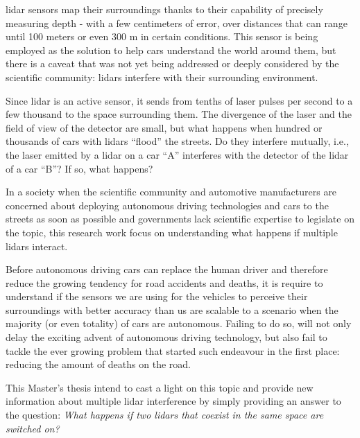 \ac{lidar} sensors map their surroundings thanks to their capability of precisely measuring depth - with a few centimeters of error, over distances that can range until 100 meters \cite{vlp16, Sullivan2016} or even 300 m in certain conditions. This sensor is being employed as the solution to help cars understand the world around them, but there is a caveat that was not yet being addressed or deeply considered by the scientific community: \acp{lidar} interfere with their surrounding environment.

Since \ac{lidar} is an active sensor, it sends from tenths of laser pulses per second to a few thousand to the space surrounding them. The divergence of the laser and the field of view of the detector are small, but what happens when hundred or thousands of cars with \acp{lidar} ``flood'' the streets. Do they interfere mutually, i.e., the laser emitted by a \ac{lidar} on a car ``A'' interferes with the detector of the \ac{lidar} of a car ``B''? If so, what happens? 

In a society when the scientific community and automotive manufacturers are concerned about deploying autonomous driving technologies and cars to the streets as soon as possible and governments lack scientific expertise to legislate on the topic, this research work focus on understanding what happens if multiple \acp{lidar} interact.

Before autonomous driving cars can replace the human driver and therefore reduce the growing tendency for road accidents and deaths, it is require to understand if the sensors we are using for the vehicles to perceive their surroundings with better accuracy than us are scalable to a scenario when the majority (or even totality) of cars are autonomous. Failing to do so, will not only delay the exciting advent of autonomous driving technology, but also fail to tackle the ever growing problem that started such endeavour in the first place: reducing the amount of deaths on the road.

This Master's thesis intend to cast a light on this topic and provide new information about multiple \ac{lidar} interference by simply providing an answer to the question: \textit{What happens if two \acp{lidar} that coexist in the same space are switched on?} 





